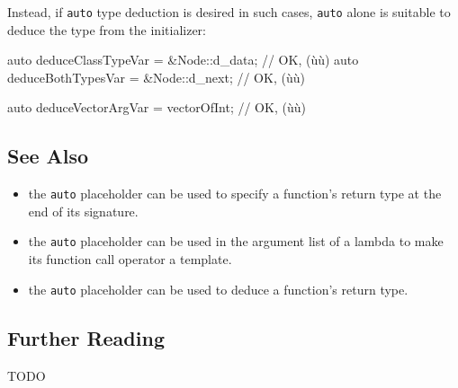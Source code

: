 \noindent Instead, if \lstinline!auto! type deduction is desired in such cases,
\lstinline!auto! alone is suitable to deduce the type from the initializer:

\begin{emcppslisting}[language=C++]
auto deduceClassTypeVar = &Node::d_data;  // OK, (ù{}ù)
auto deduceBothTypesVar = &Node::d_next;  // OK, (ù{}ù)

auto deduceVectorArgVar = vectorOfInt;    // OK, (ù{}ù)
\end{emcppslisting}
    

\subsection[See Also]{See Also}\label{see-also}
\begin{itemize}
\item{the \lstinline!auto! placeholder can be used to specify a function’s return type at the end of its signature.}
\item{the \lstinline!auto! placeholder can be used in the argument list of a lambda to make its function call operator a template.}
\item{the \lstinline!auto! placeholder can be used to deduce a function’s return type.}

\end{itemize}

\subsection[Further Reading]{Further Reading}

TODO
 
 